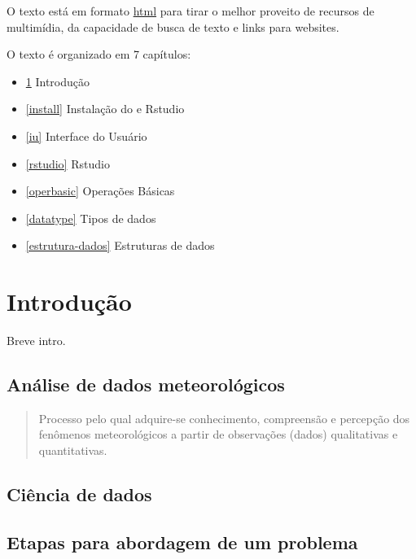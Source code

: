 \documentclass[]{book}
\begin{document}
O texto está em formato \href{https://pt.wikipedia.org/wiki/HTML}{html}
para tirar o melhor proveito de recursos de multimídia, da capacidade de
busca de texto e links para websites.

O texto é organizado em 7 capítulos:

\begin{itemize}
\item
  \ref{intro} Introdução
\item
  \ref{install} Instalação do e Rstudio
\item
  \ref{iu} Interface do Usuário
\item
  \ref{rstudio} Rstudio
\item
  \ref{operbasic} Operações Básicas
\item
  \ref{datatype} Tipos de dados
\item
  \ref{estrutura-dados} Estruturas de dados
\end{itemize}

\chapter{Introdução}\label{intro}

Breve intro.

\section{Análise de dados
meteorológicos}\label{analise-de-dados-meteorologicos}

\begin{quote}
Processo pelo qual adquire-se conhecimento, compreensão e percepção dos
fenômenos meteorológicos a partir de observações (dados) qualitativas e
quantitativas.
\end{quote}

\section{Ciência de dados}\label{ciencia-de-dados}

\section{Etapas para abordagem de um
problema}\label{etapas-para-abordagem-de-um-problema}
\end{document}
